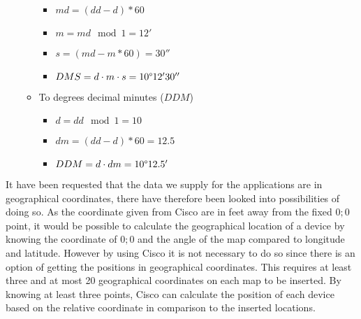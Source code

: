 \begin{itemize}
\begin{itemize}
\begin{itemize}
			\item $ md = (dd - d)*60 $
			\item $ m = md \mod 1 = 12' $
			\item $ s = (md - m * 60) = 30''$
			\item $ DMS = d \cdot m \cdot s = 10\degree 12' 30''$ 
		\end{itemize}
		\item To degrees decimal minutes ($DDM$)
		\begin{itemize}
			\item $ d = dd \mod 1 = 10 $
			\item $ dm = (dd - d) * 60 = 12.5 $
			\item $ DDM = d \cdot dm = 10\degree 12.5'$
		\end{itemize}
	\end{itemize}
\end{itemize}

It have been requested that the data we supply for the applications are in geographical coordinates, there have therefore been looked into possibilities of doing so.
As the coordinate given from Cisco are in feet away from the fixed ${0;0}$ point, it would be possible to calculate the geographical location of a device by knowing the coordinate of ${0;0}$ and the angle of the map compared to longitude and latitude. 
However by using Cisco it is not necessary to do so since there is an option of getting the positions in geographical coordinates. This requires at least three and at most 20 geographical coordinates on each map to be inserted. By knowing at least three points, Cisco can calculate the position of each device based on the relative coordinate in comparison to the inserted locations\cite{geo_cisco}.


